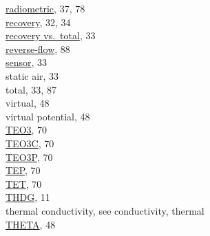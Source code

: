 \documentclass[
  english,
]{book}
\begin{document}
\hspace*{0.333em}\hspace*{0.333em}\href{./4-the-state-of-the-atmosphere.html\#AT-ITR}{radiometric},
37, 78\\
\hspace*{0.333em}\hspace*{0.333em}\href{./4-the-state-of-the-atmosphere.html\#recovery-t}{recovery},
32, 34\\
\hspace*{0.333em}\hspace*{0.333em}\href{./4-the-state-of-the-atmosphere.html\#recovery-t}{recovery
vs.~total}, 33\\
\hspace*{0.333em}\hspace*{0.333em}\href{./10-obsolete-variables.html\#ttrf}{reverse-flow},
88\\
\hspace*{0.333em}\hspace*{0.333em}\href{./4-the-state-of-the-atmosphere.html\#recovery-t}{sensor},
33\\
\hspace*{0.333em}\hspace*{0.333em}static air, 33\\
\hspace*{0.333em}\hspace*{0.333em}total, 33, 87\\
\hspace*{0.333em}\hspace*{0.333em}virtual, 48\\
\hspace*{0.333em}\hspace*{0.333em}virtual potential, 48\\
\href{./6-air-chemistry-measurements.html\#te03}{TEO3}, 70\\
\href{./6-air-chemistry-measurements.html\#te03c}{TEO3C}, 70\\
\href{./6-air-chemistry-measurements.html\#tep}{TEO3P}, 70\\
\href{./6-air-chemistry-measurements.html\#tep}{TEP}, 70\\
\href{./6-air-chemistry-measurements.html\#tet}{TET}, 70\\
\href{./3-the-state-of-the-aircraft.html\#thdg}{THDG}, 11\\
thermal conductivity, see conductivity, thermal\\
\href{./4-the-state-of-the-atmosphere.html\#theta}{THETA}, 48\\
\end{document}
